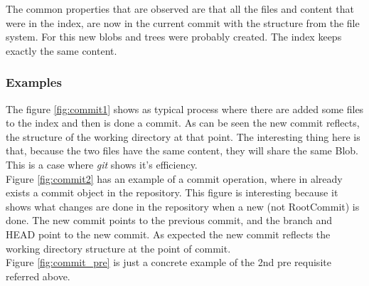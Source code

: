 The common properties that are observed are that all the files and
content that were in the index, are now in the current commit with the
structure from the file system. For this new blobs and trees were
probably created. The index keeps exactly the same content.

\subsubsection{Examples}

The figure \ref{fig:commit1} shows as typical process where there are added
some files to the index and then is done a commit. As can be seen the new commit
reflects, the structure of the working directory at that point. 
The interesting thing here is that, because the two files
have the same content, they will share the same
Blob. This is a case where \emph{git} shows it's efficiency. \\
Figure \ref{fig:commit2} has an example of a commit operation, where in 
already exists a commit object in the repository. This figure is 
interesting because it shows what changes are done in the repository when a
new (not RootCommit) is done. The new commit points to the previous commit, and
the branch and HEAD point to the new commit. As expected the new commit reflects
the working directory structure at the point of commit.\\
Figure \ref{fig:commit_pre} is just a concrete example of the 2nd pre requisite
referred above. \\

